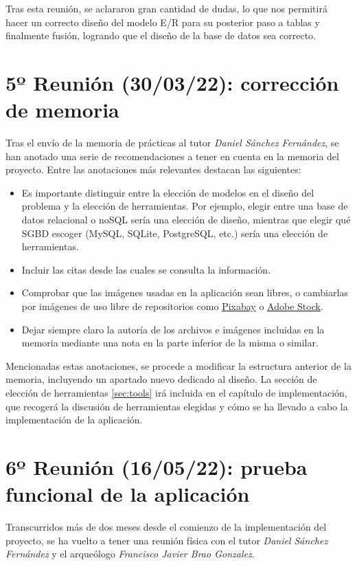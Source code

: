 Tras esta reunión, se aclararon gran cantidad de dudas, lo que nos permitirá hacer un
correcto diseño del modelo E/R para su posterior paso a tablas y finalmente fusión, logrando
que el diseño de la base de datos sea correcto.

\section{5º Reunión (30/03/22): corrección de memoria}
Tras el envío de la memoria de prácticas al tutor \textit{Daniel Sánchez Fernández}, se
han anotado una serie de recomendaciones a tener en cuenta en la memoria del proyecto. Entre
las anotaciones más relevantes destacan las siguientes:

    \begin{itemize}
        \item Es importante distinguir entre la elección de modelos en el diseño del problema
        y la elección de herramientas. Por ejemplo, elegir entre una base de datos relacional
        o noSQL sería una elección de diseño, mientras que elegir qué SGBD escoger (MySQL,
        SQLite, PostgreSQL, etc.) sería una elección de herramientas.
        \item Incluir las citas desde las cuales se consulta la información.
        \item Comprobar que las imágenes usadas en la aplicación sean libres, o cambiarlas
        por imágenes de uso libre de repositorios como \href{https://pixabay.com/}{Pixabay} o
        \href{https://stock.adobe.com/es/}{Adobe Stock}.
        \item Dejar siempre claro la autoría de los archivos e imágenes incluidas en la memoria
        mediante una nota en la parte inferior de la misma o similar.
    \end{itemize}

Mencionadas estas anotaciones, se procede a modificar la estructura anterior de la memoria,
incluyendo un apartado nuevo dedicado al diseño. La sección de elección de herramientas
\ref{sec:tools} irá incluida en el capítulo de implementación, que recogerá la discusión de
herramientas elegidas y cómo se ha llevado a cabo la implementación de la aplicación.

\section{6º Reunión (16/05/22): prueba funcional de la aplicación}
Transcurridos más de dos meses desde el comienzo de la implementación del proyecto, se ha
vuelto a tener una reunión física con el tutor \textit{Daniel Sánchez Fernández} y el
arqueólogo \textit{Francisco Javier Brao Gonzalez}.\\

